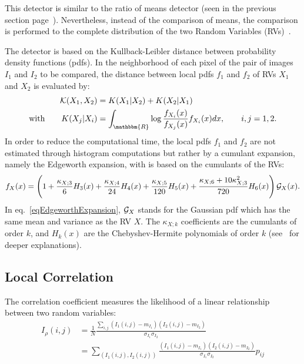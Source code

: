 This detector is similar to the ratio of means detector (seen in the 
previous section page~\pageref{sec:RatioOfMeans}). Nevertheless, 
instead of the comparison of means, the comparison is performed to
the complete distribution of the two Random Variables (RVs)~\cite{Inglada03}.

The detector is based on the Kullback-Leibler distance between probability 
density functions (pdfs). In the neighborhood of each pixel of the pair 
of images $I_1$ and $I_2$ to be compared, the distance between local pdfs 
$f_1$ and $f_2$ of RVs $X_1$ and $X_2$ is evaluated by:
\begin{align}
  {\cal K}(X_1,X_2) &= K(X_1|X_2) + K(X_2|X_1) \\
  \text{with} \qquad
  K(X_j | X_i) &= \int_{\mathbbm{R}} 
      \log \frac{f_{X_i}(x)}{f_{X_j}(x)} f_{X_i}(x) dx,\qquad i,j=1,2.
\end{align}
In order to reduce the computational time, the local pdfs $f_1$ and $f_2$ 
are not estimated through histogram computations but rather by a cumulant
expansion, namely the Edgeworth expansion, with is based on the 
cumulants of the RVs:
\begin{equation}\label{eqEdgeworthExpansion}
f_X(x) = \left( 1 + \frac{\kappa_{X;3}}{6} H_3(x) 
					+ \frac{\kappa_{X;4}}{24} H_4(x)
					+ \frac{\kappa_{X;5}}{120} H_5(x)
					+ \frac{\kappa_{X;6}+10 \kappa_{X;3}^2}{720} H_6(x) \right) {\cal G}_X(x).
\end{equation}
In eq.~\eqref{eqEdgeworthExpansion}, ${\cal G}_X$ stands for the Gaussian pdf
which has the same mean and variance as the RV $X$. The $\kappa_{X;k}$
coefficients are the cumulants of order $k$, and $H_k(x)$ are the 
Chebyshev-Hermite polynomials of order $k$ (see~\cite{Inglada07} for deeper
explanations).



\subsection{Local Correlation}
\label{sec:LocalCorrelation}
The correlation coefficient measures the likelihood of a linear
relationship between two random variables:
\begin{equation}
\begin{split}
I_\rho(i,j) &= \frac{1}{N}\frac{\sum_{i,j}(I_1(i,j)-m_{I_1})(I_2(i,j)-m_{I_2})}{\sigma_{I_1}
\sigma_{I_2}}\\
& = \sum_{(I_1(i,j),I_2(i,j))}\frac{(I_1(i,j)-m_{I_1})(I_2(i,j)-m_{I_2})}{\sigma_{I_1}
\sigma_{I_2}}p_{ij}
\end{split}
\end{equation}

